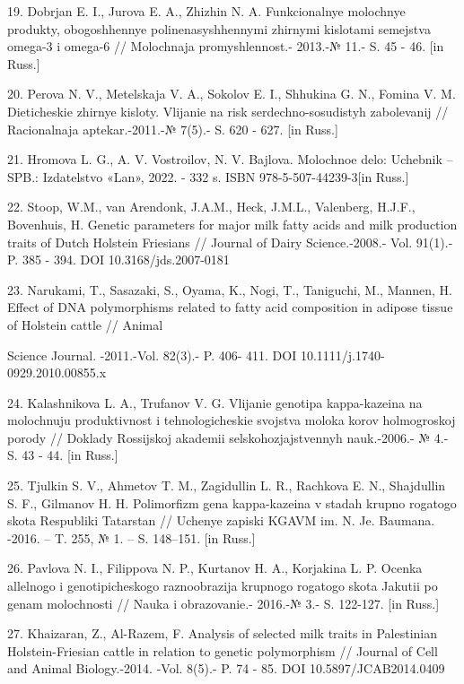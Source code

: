 19. Dobrjan E. I., Jurova E. A., Zhizhin N. A.
Funkcional\textquotesingle nye molochnye produkty, obogoshhennye
polinenasyshhennymi zhirnymi kislotami semejstva omega-3 i omega-6 //
Molochnaja promyshlennost\textquotesingle.- 2013.-№ 11.- S. 45 - 46.
{[}in Russ.{]}

20. Perova N. V., Metel\textquotesingle skaja V. A., Sokolov E. I.,
Shhukina G. N., Fomina V. M. Dieticheskie zhirnye kisloty. Vlijanie na
risk serdechno-sosudistyh zabolevanij // Racional\textquotesingle naja
aptekar\textquotesingle.-2011.-№ 7(5).- S. 620 - 627. {[}in Russ.{]}

21. Hromova L. G., A. V. Vostroilov, N. V. Bajlova. Molochnoe delo:
Uchebnik -- SPB.: Izdatel\textquotesingle stvo «Lan\textquotesingle»,
2022. - 332 s. ISBN 978-5-507-44239-3{[}in Russ.{]}

22. Stoop, W.M., van Arendonk, J.A.M., Heck, J.M.L., Valenberg, H.J.F.,
Bovenhuis, H. Genetic parameters for major milk fatty acids and milk
production traits of Dutch Holstein Friesians // Journal of Dairy
Science.-2008.- Vol. 91(1).-P. 385 - 394. DOI 10.3168/jds.2007-0181

23. Narukami, T., Sasazaki, S., Oyama, K., Nogi, T., Taniguchi, M.,
Mannen, H. Effect of DNA polymorphisms related to fatty acid composition
in adipose tissue of Holstein cattle // Animal

Science Journal. -2011.-Vol. 82(3).- P. 406- 411. DOI
10.1111/j.1740-0929.2010.00855.x

24. Kalashnikova L. A., Trufanov V. G. Vlijanie genotipa kappa-kazeina
na molochnuju produktivnost\textquotesingle{} i tehnologicheskie
svojstva moloka korov holmogroskoj porody // Doklady Rossijskoj akademii
sel\textquotesingle skohozjajstvennyh nauk.-2006.- № 4.- S. 43 - 44.
{[}in Russ.{]}

25. Tjul\textquotesingle kin S. V., Ahmetov T. M., Zagidullin L. R.,
Rachkova E. N., Shajdullin S. F., Gil\textquotesingle manov H. H.
Polimorfizm gena kappa-kazeina v stadah krupno rogatogo skota Respubliki
Tatarstan // Uchenye zapiski KGAVM im. N. Je. Baumana. -2016. -- T. 255,
№ 1. -- S. 148--151. {[}in Russ.{]}

26. Pavlova N. I., Filippova N. P., Kurtanov H. A., Korjakina L. P.
Ocenka allel\textquotesingle nogo i genotipicheskogo raznoobrazija
krupnogo rogatogo skota Jakutii po genam molochnosti // Nauka i
obrazovanie.- 2016.-№ 3.- S. 122-127. {[}in Russ.{]}

27. Khaizaran, Z., Al-Razem, F. Analysis of selected milk traits in
Palestinian Holstein-Friesian cattle in relation to genetic polymorphism
// Journal of Cell and Animal Biology.-2014. -Vol. 8(5).- P. 74 - 85.
DOI 10.5897/JCAB2014.0409

